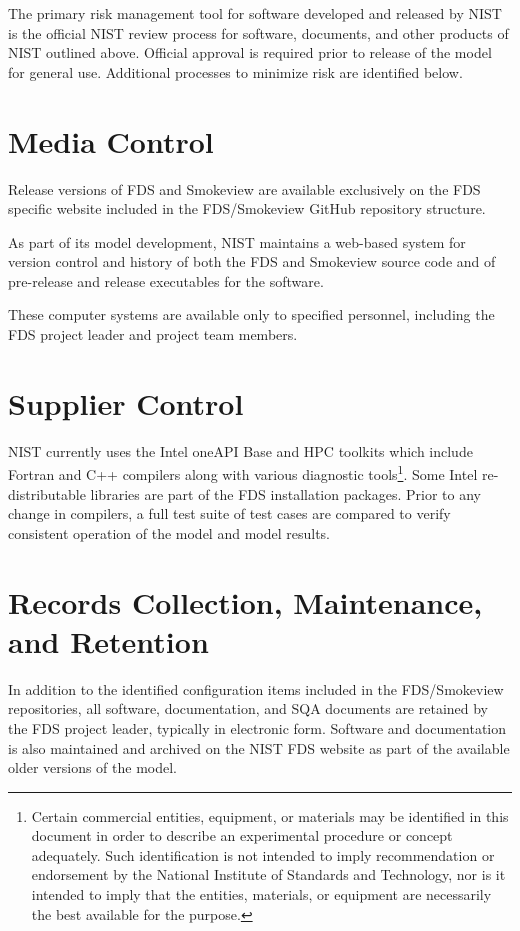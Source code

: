 \documentclass[11pt]{book}
\begin{document}
The primary risk management tool for software developed and released by NIST is the official NIST review process for software, documents, and other products of NIST outlined above. Official approval is required prior to release of the model for general use. Additional processes to minimize risk are identified below.

\section{Media Control}

Release versions of FDS and Smokeview are available exclusively on the FDS specific website included in the FDS/Smokeview GitHub repository structure.

As part of its model development, NIST maintains a web-based system for version control and history of both the FDS and Smokeview source code and of pre-release and release executables for the software.

These computer systems are available only to specified personnel, including the FDS project leader and project team members.

\section{Supplier Control}

NIST currently uses the Intel oneAPI Base and HPC toolkits which include Fortran and C++ compilers along with various diagnostic tools\footnote{Certain commercial entities, equipment, or materials may be identified in this document in order to describe an experimental procedure or concept adequately. Such identification is not intended to imply recommendation or endorsement by the National Institute of Standards and Technology, nor is it intended to imply that the entities, materials, or equipment are necessarily the best available for the purpose.}. Some Intel re-distributable libraries are part of the FDS installation packages.  Prior to any change in compilers, a full test suite of test cases are compared to verify consistent operation of the model and model results.

\section{Records Collection, Maintenance, and Retention}

In addition to the identified configuration items included in the FDS/Smokeview repositories, all software, documentation, and SQA documents are retained by the FDS project leader, typically in electronic form. Software and documentation is also maintained and archived on the NIST FDS website as part of the available older versions of the model.
\end{document}
